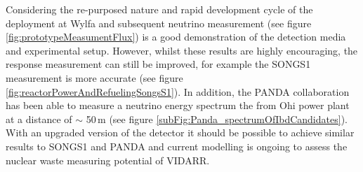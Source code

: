 Considering the re-purposed nature and rapid development cycle of the deployment at Wylfa and subsequent neutrino measurement (see figure \ref{fig:prototypeMeasumentFlux}) is a good demonstration of the detection media and experimental setup. However, whilst these results are highly encouraging, the response measurement can still be improved, for example the SONGS1 measurement is more accurate (see figure \ref{fig:reactorPowerAndRefuelingSongsS1}). In addition, the PANDA collaboration has been able to measure a neutrino energy spectrum the from Ohi power plant at a distance of $\sim$ 50\,m \cite{IIRIE_Panda_2021} (see figure \ref{subFig:Panda_spectrumOfIbdCandidates}). With an upgraded version of the detector it should be possible to achieve similar results to SONGS1 and PANDA and current modelling is ongoing to assess the nuclear waste measuring potential of VIDARR. 

